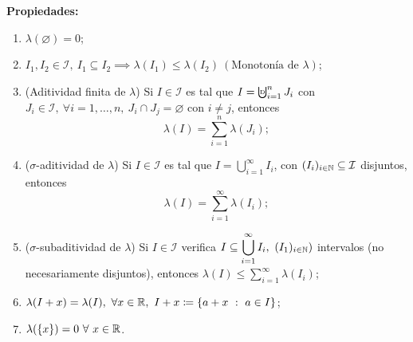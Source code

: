 	\noindent \textbf{Propiedades:}
	\begin{enumerate}
		\item $\lambda (\varnothing) = 0$;

		\item $I_1,I_2 \in \mathcal{I},\ I_1\subseteq I_2 \implies \lambda (I_1) \leq \lambda (I_2) \ (\text{Monotonía de } \lambda)$;

		\item (Aditividad finita de $\lambda$) Si $I \in \mathcal{I}$ es tal que $I = \textbigcupd_{i=1}^{n} J_i$ con $J_i \in \mathcal{I},\ \forall i = 1,\dots,n,\ J_i \cap J_j = \varnothing$ con $i\neq j$, entonces
		\[
		\lambda (I) = \sum_{i=1}^{n} \lambda (J_i);
		\]

		\item ($\sigma$-aditividad de $\lambda$) Si $I \in \mathcal{I}$ es tal que $I = \bigcup_{i=1}^{\infty} I_i $, con $(I_i)_{i \in \mathbb{N}} \subseteq \mathcal{I}$ disjuntos, entonces
		\[
		\lambda(I) = \sum_{i=1}^{\infty} \lambda (I_i)
		;\]

		\item ($\sigma$-subaditividad de $\lambda$) Si $I \in \mathcal{I}$ verifica $I \subseteq \displaystyle\bigcup_{i=1}^{\infty} I_i, \ (I_1)_{i \in \mathbb{N}})$ intervalos (no necesariamente disjuntos), entonces $\lambda (I) \leq \sum_{i=1}^{\infty} \lambda (I_i)$;

		\item $\lambda (I + x) = \lambda (I), \ \forall x \in \R, \ I+x \coloneq \{a + x \ : \ a \in I \} $;

		\item $\lambda(\{x\}) = 0 \ \forall \ x \in \mathbb{R}$.  
	\end{enumerate}
